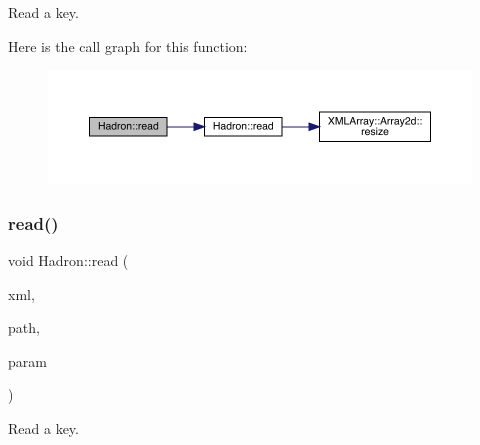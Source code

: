 Read a key. 

Here is the call graph for this function\+:
\nopagebreak
\begin{figure}[H]
\begin{center}
\leavevmode
\includegraphics[width=350pt]{d1/daf/namespaceHadron_adde6149254919751c9f0e1b2b12c4d17_cgraph}
\end{center}
\end{figure}
\mbox{\label{namespaceHadron_a61520b9a5ce2b207d1c01e1508a5c470}} 
\subsubsection{\texorpdfstring{read()}{read()}\hspace{0.1cm}{\footnotesize\ttfamily [23/94]}}
{\footnotesize\ttfamily void Hadron\+::read (\begin{DoxyParamCaption}\item[{\mbox{\hyperlink{classADATXML_1_1XMLReader}{X\+M\+L\+Reader}} \&}]{xml,  }\item[{const std\+::string \&}]{path,  }\item[{\mbox{\hyperlink{structHadron_1_1KeyBaryonElementalOperator__t}{Key\+Baryon\+Elemental\+Operator\+\_\+t}} \&}]{param }\end{DoxyParamCaption})}



Read a key. 

